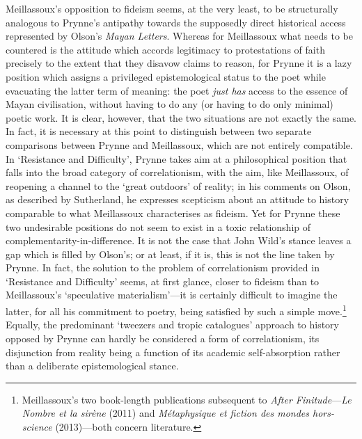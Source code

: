 \documentclass[]{article}
\begin{document}
Meillassoux’s opposition to fideism seems, at the very least, to be
structurally analogous to Prynne’s antipathy towards the supposedly
direct historical access represented by Olson’s \emph{Mayan Letters}.
Whereas for Meillassoux what needs to be countered is the attitude which
accords legitimacy to protestations of faith precisely to the extent
that they disavow claims to reason, for Prynne it is a lazy position
which assigns a privileged epistemological status to the poet while
evacuating the latter term of meaning: the poet \emph{just has} access
to the essence of Mayan civilisation, without having to do any (or
having to do only minimal) poetic work. It is clear, however, that the
two situations are not exactly the same. In fact, it is necessary at
this point to distinguish between two separate comparisons between
Prynne and Meillassoux, which are not entirely compatible. In
‘Resistance and Difficulty’, Prynne takes aim at a philosophical
position that falls into the broad category of correlationism, with the
aim, like Meillassoux, of reopening a channel to the ‘great outdoors’ of
reality; in his comments on Olson, as described by Sutherland, he
expresses scepticism about an attitude to history comparable to what
Meillassoux characterises as fideism. Yet for Prynne these two
undesirable positions do not seem to exist in a toxic relationship of
complementarity-in-difference. It is not the case that John Wild’s
stance leaves a gap which is filled by Olson’s; or at least, if it is,
this is not the line taken by Prynne. In fact, the solution to the
problem of correlationism provided in ‘Resistance and Difficulty’ seems,
at first glance, closer to fideism than to Meillassoux’s ‘speculative
materialism’—it is certainly difficult to imagine the latter, for all
his commitment to poetry, being satisfied by such a simple
move.\footnote{Meillassoux’s two book-length publications subsequent to
  \emph{After Finitude}—\emph{Le Nombre et la sirène} (2011) and
  \emph{Métaphysique et fiction des mondes hors-science} (2013)—both
  concern literature.} Equally, the predominant ‘tweezers and tropic
catalogues’ approach to history opposed by Prynne can hardly be
considered a form of correlationism, its disjunction from reality being
a function of its academic self-absorption rather than a deliberate
epistemological stance.
\end{document}

